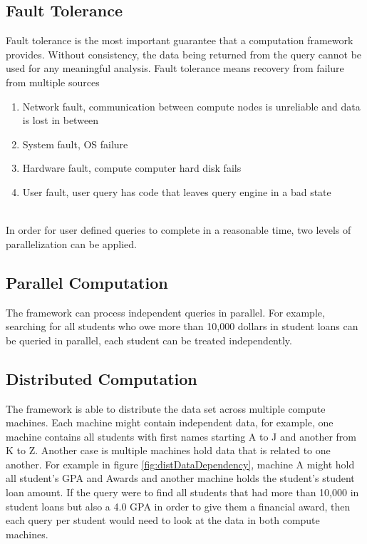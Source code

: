 \documentclass[10pt,twocolumn]{IEEEtran11}
\begin{document}
\subsection{Fault Tolerance}
Fault tolerance is the most important guarantee that a computation framework provides.  Without consistency, the data being returned from the query cannot be used for any meaningful analysis. Fault tolerance means recovery from failure from multiple sources
\  \\
\begin{enumerate}
	\setlength\itemsep{1em}
	\item Network fault, communication between compute nodes is unreliable and data is lost in between
	\item System fault, OS failure
	\item Hardware fault, compute computer hard disk fails
	\item User fault, user query has code that leaves query engine in a bad state
\end{enumerate}
\  \\
In order for user defined queries to complete in a reasonable time, two levels of parallelization can be applied.

\subsection{Parallel Computation}
The framework can process independent queries in parallel.  For example, searching for all students who owe more than 10,000 dollars in student loans
can be queried in parallel, each student can be treated independently.

\subsection{Distributed Computation}
The framework is able to distribute the data set across multiple compute machines.  Each machine might contain independent data, for example, one machine contains all students with first names starting A to J and another from K to Z.  Another case is multiple machines hold data that is related to one another.  For example in figure \ref{fig:distDataDependency}, machine A might hold all student's GPA and Awards and another machine holds the student's student loan amount.
If the query were to find all students that had more than 10,000 in student loans but also a 4.0 GPA in order to give them a financial award, then each query per student would need to look at the data in both compute machines.
\end{document}
